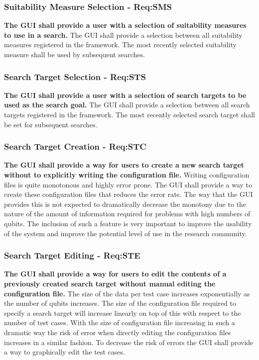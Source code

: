 \subsubsection{Suitability Measure Selection - Req:SMS}
\label{sec:reqsms}
\textbf{The GUI shall provide a user with a selection of suitability measures to use in a search.}
The GUI shall provide a selection between all suitability measures registered in the framework.
The most recently selected suitability measure shall be used by subsequent searches.

\subsubsection{Search Target Selection - Req:STS}
\label{sec:reqsts}
\textbf{The GUI shall provide a user with a selection of search targets to be used as the search goal.}
The GUI shall provide a selection between all search targets registered in the framework.
The most recently selected search target shall be set for subsequent searches.

\subsubsection{Search Target Creation - Req:STC}
\label{sec:reqstc}
\textbf{The GUI shall provide a way for users to create a new search target without to explicitly writing the configuration file.}
Writing configuration files is quite monotonous and highly error prone.
The GUI shall provide a way to create these configuration files that reduces the error rate.
The way that the GUI provides this is not expected to dramatically decrease the monotony due to the nature of the amount of information required for problems with high numbers of qubits.
The inclusion of such a feature is very important to improve the usability of the system and improve the potential level of use in the research community.

\subsubsection{Search Target Editing - Req:STE}
\label{sec:reqste}
\textbf{The GUI shall provide a way for users to edit the contents of a previously created search target without manual editing the configuration file.}
The size of the data per test case increases exponentially as the number of qubits increases.
The size of the configuration file required to specify a search target will increase linearly on top of this with respect to the number of test cases.
With the size of configuration file increasing in such a dramatic way the risk of error when directly editing the configuration files increases in a similar fashion.
To decrease the risk of errors the GUI shall provide a way to graphically edit the test cases.

